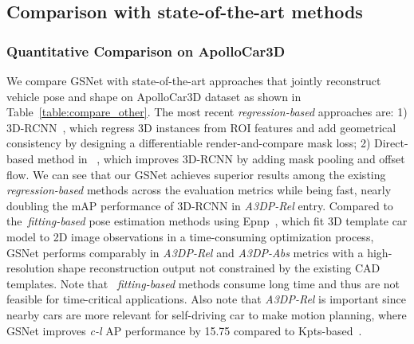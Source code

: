 \documentclass[runningheads]{llncs}
\begin{document}
\subsection{Comparison with state-of-the-art methods}
\label{sec:performance}

\subsubsection{Quantitative Comparison on ApolloCar3D}
\label{sec:quantitative_analysis}
We compare GSNet with state-of-the-art approaches that jointly reconstruct vehicle pose and shape on ApolloCar3D dataset as shown in Table~\ref{table:compare_other}. 
The most recent \textit{regression-based} approaches are:
1) 3D-RCNN~\cite{kundu20183d}, which regress 3D instances from ROI features and add geometrical consistency by designing a differentiable render-and-compare mask loss;
2) Direct-based method in ~\cite{song2019apollocar3d}, which improves 3D-RCNN by adding mask pooling and offset flow.
We can see that our GSNet achieves superior results among the existing \textit{regression-based} methods across the evaluation metrics while being fast, nearly doubling the mAP performance of 3D-RCNN in \textit{A3DP-Rel} entry. Compared to the~\textit{fitting-based} pose estimation methods using Epnp~\cite{lepetit2009epnp}, which fit 3D template car model to 2D image observations in a time-consuming optimization process, GSNet performs comparably in \textit{A3DP-Rel} and \textit{A3DP-Abs} metrics with a high-resolution shape reconstruction output not constrained by the existing CAD templates. Note that ~\textit{fitting-based} methods consume long time and thus are not feasible for time-critical applications. Also note that \textit{A3DP-Rel} is important since nearby cars are more relevant for self-driving car to make motion planning, where GSNet improves \textit{c-l} AP performance by 15.75 compared to Kpts-based~\cite{song2019apollocar3d}. 
\end{document}
